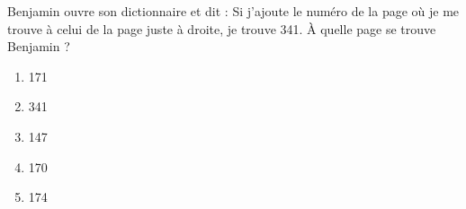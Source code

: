 Benjamin ouvre son dictionnaire et dit : \og Si j'ajoute le numéro de la page où je me trouve à celui de la page juste à droite, je trouve 341\fg. \`A quelle page se trouve Benjamin ?
\begin{multicols}{5}
  \begin{enumerate}[A/]
  \item 171
  \item 341
  \item 147
  \item 170
  \item 174
  \end{enumerate}
\end{multicols}